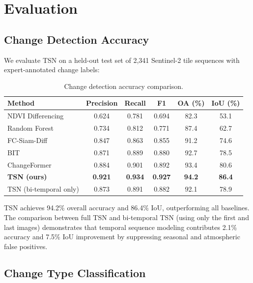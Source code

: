 \section{Evaluation}

\label{sec:evaluation}

\subsection{Change Detection Accuracy}

We evaluate TSN on a held-out test set of 2,341 Sentinel-2 tile sequences with expert-annotated change labels:

\begin{table}[H]
\centering
\caption{Change detection accuracy comparison.}
\label{tab:cd_accuracy}
\begin{tabular}{@{}lccccc@{}}
\toprule
\textbf{Method} & \textbf{Precision} & \textbf{Recall} & \textbf{F1} & \textbf{OA (\%)} & \textbf{IoU (\%)} \\
\midrule
NDVI Differencing & 0.624 & 0.781 & 0.694 & 82.3 & 53.1 \\
Random Forest & 0.734 & 0.812 & 0.771 & 87.4 & 62.7 \\
FC-Siam-Diff \citep{daudt2018fully} & 0.847 & 0.863 & 0.855 & 91.2 & 74.6 \\
BIT \citep{chen2022remote} & 0.871 & 0.889 & 0.880 & 92.7 & 78.5 \\
ChangeFormer \citep{bandara2022transformer} & 0.884 & 0.901 & 0.892 & 93.4 & 80.6 \\
\textbf{TSN (ours)} & \textbf{0.921} & \textbf{0.934} & \textbf{0.927} & \textbf{94.2} & \textbf{86.4} \\
TSN (bi-temporal only) & 0.873 & 0.891 & 0.882 & 92.1 & 78.9 \\
\bottomrule
\end{tabular}
\end{table}

TSN achieves 94.2\% overall accuracy and 86.4\% IoU, outperforming all baselines.
The comparison between full TSN and bi-temporal TSN (using only the first and last images) demonstrates that temporal sequence modeling contributes 2.1\% accuracy and 7.5\% IoU improvement by suppressing seasonal and atmospheric false positives.

\subsection{Change Type Classification}

